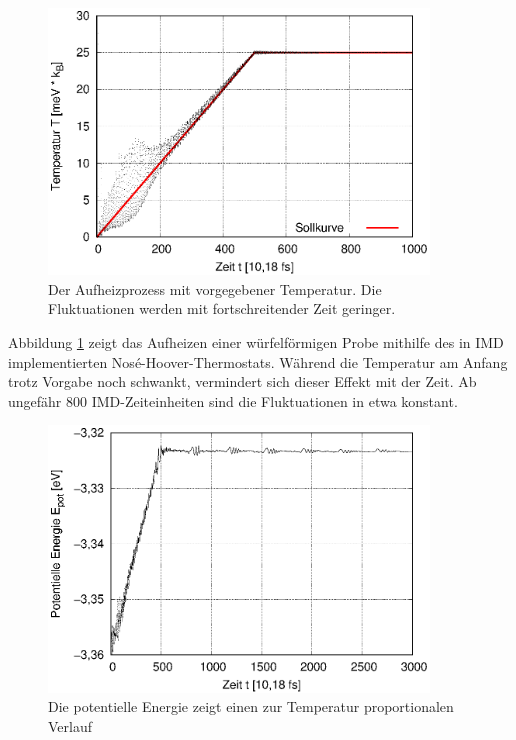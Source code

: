 		\begin{figure}[!ht]
			\centering
			\includegraphics[width=0.9\textwidth]{chapter/main/single/plt/equilibration/thermostat.eps}
			\caption{Der Aufheizprozess mit vorgegebener Temperatur. Die Fluktuationen werden
			mit fortschreitender Zeit geringer.}
			\label{fig:thermostat}
		\end{figure}

		Abbildung \ref{fig:thermostat} zeigt das Aufheizen einer würfelförmigen Probe mithilfe des
		in IMD implementierten Nosé-Hoover-Thermostats. Während die Temperatur am Anfang trotz
		Vorgabe noch schwankt, vermindert sich dieser Effekt mit der Zeit. Ab ungefähr 800
		IMD-Zeiteinheiten sind die Fluktuationen in etwa konstant.

		\begin{figure}[!ht]
			\centering
			\includegraphics[width=0.9\textwidth]{chapter/main/single/plt/equilibration/thermostat_pot.eps}
			\caption{Die potentielle Energie zeigt einen zur Temperatur proportionalen Verlauf}
			\label{fig:thermostat_pot}
		\end{figure}

